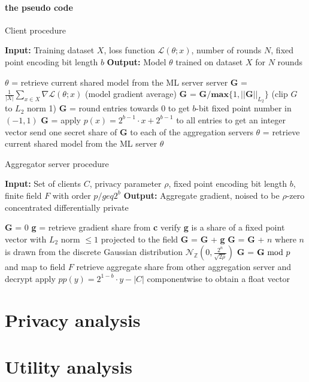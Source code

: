 \documentclass{article}
\begin{document}
\paragraph{the pseudo code}

\begin{algorithm}
  \caption{Client procedure}\label{client}

  \begin{algorithmic}[1]
  \State\textbf{Input:} Training dataset $X$, loss function $\mathcal L(\theta; x)$, number of rounds $N$, fixed point encoding bit length $b$
  \State\textbf{Output:} Model $\theta$ trained on dataset $X$ for $N$ rounds

  \State$\theta$ = retrieve current shared model from the ML server server
  \State\textbf{G} = $\frac{1}{|X|} \sum_{x\in X} \nabla\mathcal L(\theta; x)$ (model gradient average)
  \State\textbf{G} = $\textbf{G}/\mathbf{max}\{1,||\textbf{G}||_{L_2}\}$ (clip $G$ to $L_2$ norm 1)
  \State\textbf{G} = round entries towards $0$ to get $b$-bit fixed point number in $(-1, 1)$
  \State\textbf{G} = apply $p(x) = 2^{b-1}\cdot x + 2^{b-1}$ to all entries to get an integer vector
  \State send one secret share of \textbf{G} to each of the aggregation servers
  \EndFor
  \State$\theta$ = retrieve current shared model from the ML server
  \State\Return $\theta$
  \end{algorithmic}
\end{algorithm}


\begin{algorithm}
  \caption{Aggregator server procedure}\label{server}
  \begin{algorithmic}[1]
  \State \textbf{Input:} Set of clients $C$, privacy parameter $\rho$, fixed point encoding bit length $b$, finite field $F$ with order $p /geq 2^b$
  \State \textbf{Output:} Aggregate gradient, noised to be $\rho$-zero concentrated differentially private

  \State \textbf{G} = 0
       \State \textbf{g} = retrieve gradient share from \textbf{c}
	   \State verify \textbf{g} is a share of a fixed point vector with $L_2$ norm $\leq 1$ projected to the field
	   \State \textbf{G} = \textbf{G} + \textbf{g}
  \EndFor
  \State \textbf{G} = \textbf{G} + $n$ where $n$ is drawn from the discrete Gaussian distribution $\mathcal N_\mathbb{Z}(0,\frac{2^n}{\sqrt{2\rho}})$
  \State \textbf{G} = $\textbf{G}\textnormal{ mod } p$ and map to field $F$
  \State retrieve aggregate share from other aggregation server and decrypt
  \State apply $pp(y) = 2^{1-b} \cdot y - |C|$ componentwise to obtain a float vector
  \end{algorithmic}
\end{algorithm}
\section{Privacy analysis}


\section{Utility analysis}



\end{document}
